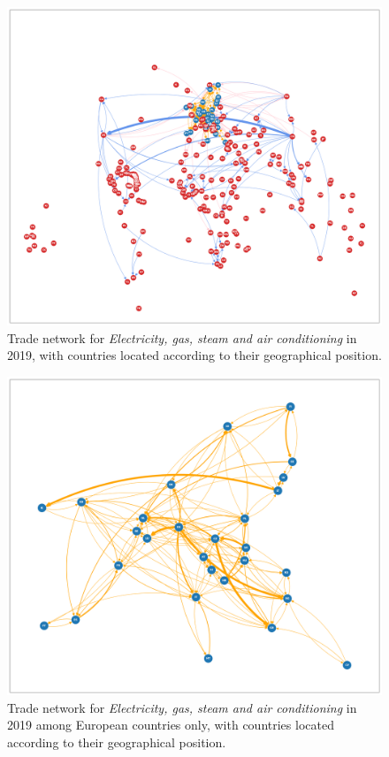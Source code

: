 \begin{figure}[H]
    \centering
    \includegraphics[height=0.4\textheight]{pics/full_y19_p35_force_79.png}
    \caption[Trade network for \textit{Electricity, gas, steam and air conditioning} in 2019]{Trade network for \textit{Electricity, gas, steam and air conditioning} in 2019, with countries located according to their geographical position.}
    \label{fig:elecgeo}
\end{figure}

\begin{figure}[H]
\centering
    \includegraphics[height=0.4\textheight]{pics/full_y19_p35_force_82.png}
    \caption[Trade network for \textit{Electricity, gas, steam and air conditioning} in 2019 among European countries only.]{Trade network for \textit{Electricity, gas, steam and air conditioning} in 2019 among European countries only, with countries located according to their geographical position.}
    \label{fig:elecgeoeur}
\end{figure}
         

